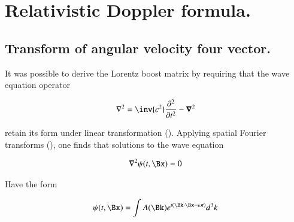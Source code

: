 
%
%
%




\chapter{Relativistic Doppler formula.}

%

\section{Transform of angular velocity four vector.}

It was possible to derive the Lorentz boost matrix by requiring that the wave equation operator

\begin{align}
\grad^2 = \inv{c^2}\frac{\partial^2}{\partial t^2} - \spacegrad^2
\end{align}

retain its form under linear transformation (\cite{PJLorentzWave}).  Applying spatial Fourier transforms (\cite{PJwaveFourier}), one finds that solutions to the wave equation 

\begin{align}
\grad^2 \psi(t,\Bx) = 0
\end{align}

Have the form

\begin{align}
\psi(t, \Bx) = \int A(\Bk) e^{i(\Bk \cdot \Bx - \omega t)} d^3 k
\end{align}

